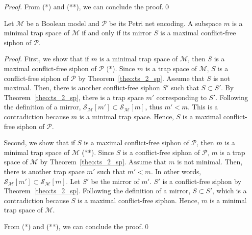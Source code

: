 \documentclass[runningheads]{llncs}
\begin{document}
\begin{proof}
  From (*) and (**), we can conclude the proof.\qed
  
\end{proof}

\begin{theorem}
\label{theo:min_ts_2_max_sp}

  Let \(\mathcal{M}\) be a Boolean model and \(\mathcal{P}\) be its Petri net encoding. A subspace \(m\) is a minimal trap space of \(\mathcal{M}\) if and only if its mirror \(S\) is a maximal conflict-free siphon of \(\mathcal{P}\).

\end{theorem}

\begin{proof}

  First, we show that if \(m\) is a minimal trap space of \(\mathcal{M}\), then \(S\) is a maximal conflict-free siphon of \(\mathcal{P}\) (*). Since \(m\) is a trap space of \(\mathcal{M}\), \(S\) is a conflict-free siphon of \(\mathcal{P}\) by Theorem~\ref{theo:ts_2_sp}. Assume that \(S\) is not maximal. Then, there is another conflict-free siphon \(S'\) such that \(S \subset S'\). By Theorem~\ref{theo:ts_2_sp}, there is a trap space \(m'\) corresponding to \(S'\). Following the definition of a mirror, \(\mathcal{S}_{\mathcal{M}}[m'] \subset \mathcal{S}_{\mathcal{M}}[m]\), thus \(m' < m\). This is a contradiction because \(m\) is a minimal trap space. Hence, \(S\) is a maximal conflict-free siphon of \(\mathcal{P}\).
  
  Second, we show that if \(S\) is a maximal conflict-free siphon of \(\mathcal{P}\), then \(m\) is a minimal trap space of \(\mathcal{M}\) (**). Since \(S\) is a conflict-free siphon of \(\mathcal{P}\), \(m\) is a trap space of \(\mathcal{M}\) by Theorem~\ref{theo:ts_2_sp}. Assume that \(m\) is not minimal. Then, there is another trap space \(m'\) such that \(m' < m\). In other words, \(\mathcal{S}_{\mathcal{M}}[m'] \subset \mathcal{S}_{\mathcal{M}}[m]\). Let \(S'\) be the mirror of \(m'\). \(S'\) is a conflict-free siphon by Theorem~\ref{theo:ts_2_sp}. Following the definition of a mirror, \(S \subset S'\), which is a contradiction because \(S\) is a maximal conflict-free siphon. Hence, \(m\) is a minimal trap space of \(\mathcal{M}\).
  
  From (*) and (**), we can conclude the proof.\qed
  
\end{proof}
\end{document}
